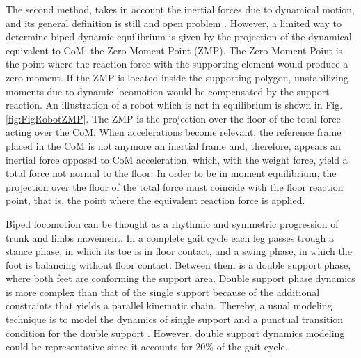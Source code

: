 
The second method, takes in account the inertial forces due to
dynamical motion, and its general definition is still and open problem
\cite{Azevedo04Artificial}. However, a limited way to determine biped
dynamic equilibrium is given by the projection of the dynamical
equivalent to CoM: the Zero Moment Point (ZMP). The Zero Moment Point
is the point where the reaction force with the supporting element
would produce a zero moment. If the ZMP is located inside the
supporting polygon, unstabilizing moments due to dynamic locomotion
would be compensated by the support reaction. An illustration of a
robot which is not in equilibrium is shown in
Fig. \ref{fig:FigRobotZMP}. The ZMP is the projection over the floor
of the total force acting over the CoM. When accelerations become
relevant, the reference frame placed in the CoM is not anymore an
inertial frame and, therefore, appears an inertial force opposed to
CoM acceleration, which, with the weight force, yield a total force
not normal to the floor. In order to be in moment equilibrium, the
projection over the floor of the total force must coincide with the
floor reaction point, that is, the point where the equivalent reaction
force is applied. 



Biped locomotion can be thought as a rhythmic and symmetric
progression of trunk and limbs movement. In a complete gait cycle each
leg passes trough a stance phase, in which its toe is in floor
contact, and a swing phase, in which the foot is balancing without
floor contact. Between them is a double support phase, where both feet
are conforming the support area. Double support phase dynamics is more
complex than that of the single support because of the additional
constraints that yields a parallel kinematic chain. Thereby, a usual
modeling technique is to model the dynamics of single support and a
punctual transition condition for the double support
\cite{Garcia98simplest}. However, double support dynamics modeling
could be representative since it accounts for 20\% of the gait cycle.


